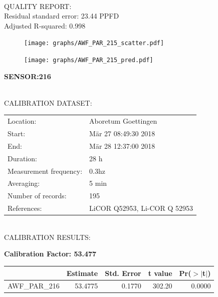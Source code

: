 \documentclass[oneside]{report}
\begin{document}
\hrulefill\\
QUALITY REPORT:\\
Residual standard error: 23.44 PPFD\\
Adjusted R-squared: 0.998



\begin{figure}[H]
  \centering
  \texttt{[image: graphs/AWF\_PAR\_215\_scatter.pdf]}
\end{figure}




\begin{figure}[H]
  \centering
  \texttt{[image: graphs/AWF\_PAR\_215\_pred.pdf]}
\end{figure}

\pagebreak


\begin{center}
\large{\textbf{SENSOR:216}}\\
\end{center}

\hrulefill\\
CALIBRATION DATASET:\\
\begin{table}[h!]
  \centering
  \label{tab:table1}
  \begin{tabular}{ll}
    Location: & Aboretum Goettingen\\ 
    
    
    Start:  & Mär 27 08:49:30 2018 \\
    End:   & Mär 28 12:37:00 2018\\ 
    Duration: & 28 h\\
    Measurement frequency: & 0.3hz\\
    Averaging:  &5 min\\
    Number of records: & 195 \\
    References: & LiCOR Q52953, Li-COR Q 52953 \\
  \end{tabular}
\end{table}

\hrulefill\\
CALIBRATION RESULTS:\\


\begin{center}
\textbf{\large{Calibration Factor: 53.477}}\\
\end{center}
\begin{table}[ht]
\centering
\begin{tabular}{rrrrr}
  \hline
 & Estimate & Std. Error & t value & Pr($>$$|$t$|$) \\ 
  \hline
AWF\_PAR\_216 & 53.4775 & 0.1770 & 302.20 & 0.0000 \\ 
   \hline
\end{tabular}
\end{table}
\end{document}
